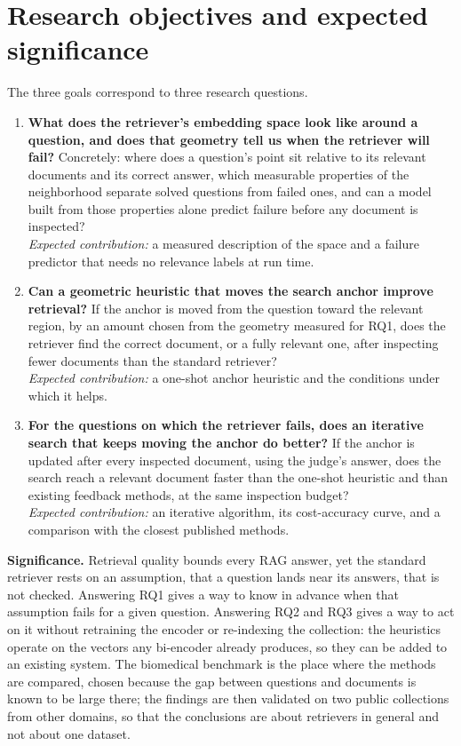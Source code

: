 \documentclass[12pt,a4paper]{article}
\begin{document}
\section{Research objectives and expected significance}

The three goals correspond to three research questions.

\begin{enumerate}[label=\textbf{RQ\arabic*.}, leftmargin=2.6em]
  \item \textbf{What does the retriever's embedding space look like around a question, and does that geometry tell us when the retriever will fail?} Concretely: where does a question's point sit relative to its relevant documents and its correct answer, which measurable properties of the neighborhood separate solved questions from failed ones, and can a model built from those properties alone predict failure before any document is inspected?\\[2pt] \textit{Expected contribution:} a measured description of the space and a failure predictor that needs no relevance labels at run time.
  \item \textbf{Can a geometric heuristic that moves the search anchor improve retrieval?} If the anchor is moved from the question toward the relevant region, by an amount chosen from the geometry measured for RQ1, does the retriever find the correct document, or a fully relevant one, after inspecting fewer documents than the standard retriever?\\[2pt] \textit{Expected contribution:} a one-shot anchor heuristic and the conditions under which it helps.
  \item \textbf{For the questions on which the retriever fails, does an iterative search that keeps moving the anchor do better?} If the anchor is updated after every inspected document, using the judge's answer, does the search reach a relevant document faster than the one-shot heuristic and than existing feedback methods, at the same inspection budget?\\[2pt] \textit{Expected contribution:} an iterative algorithm, its cost-accuracy curve, and a comparison with the closest published methods.
\end{enumerate}

\textbf{Significance.} Retrieval quality bounds every RAG answer, yet the standard retriever rests on an assumption, that a question lands near its answers, that is not checked. Answering RQ1 gives a way to know in advance when that assumption fails for a given question. Answering RQ2 and RQ3 gives a way to act on it without retraining the encoder or re-indexing the collection: the heuristics operate on the vectors any bi-encoder already produces, so they can be added to an existing system. The biomedical benchmark is the place where the methods are compared, chosen because the gap between questions and documents is known to be large there; the findings are then validated on two public collections from other domains, so that the conclusions are about retrievers in general and not about one dataset.
\end{document}
